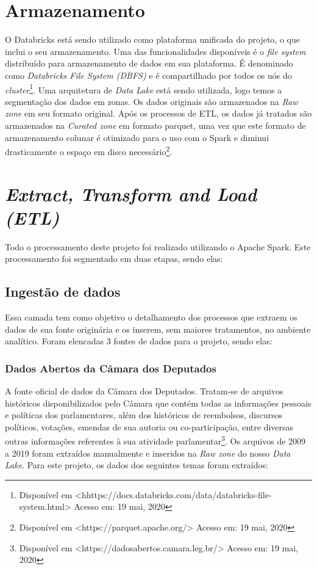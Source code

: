 \section{Armazenamento} O Databricks está sendo utilizado como plataforma unificada do projeto, o que inclui o seu armazenamento. Uma das funcionalidades disponíveis é o \textit{file system} distribuído para armazenamento de dados em sua plataforma. É denominado como \textit{Databricks File System (DBFS)} e é compartilhado por todos os nós do \textit{cluster}\footnote{Disponível em <hhttps://docs.databricks.com/data/databricks-file-system.html> Acesso em: 19 mai, 2020}. Uma arquitetura de \textit{Data Lake} está sendo utilizada, logo temos a segmentação dos dados em zonas. Os dados originais são armazenados na \textit{Raw zone} em seu formato original. Após os processos de ETL, os dados já tratados são armazenados na \textit{Curated zone} em formato parquet, uma vez que este formato de armazenamento colunar é otimizado para o uso com o Spark e diminui drasticamente o espaço em disco necessário\footnote{Disponível em <https://parquet.apache.org/> Acesso em: 19 mai, 2020}.

\section{\textit{Extract, Transform and Load (ETL)}} Todo o processamento deste projeto foi realizado utilizando o Apache Spark. Este processamento foi segmentado em duas etapas, sendo elas:

\subsection{Ingestão de dados} Essa camada tem como objetivo o detalhamento dos processos que extraem os dados de sua fonte originária e os inserem, sem maiores tratamentos, no ambiente analítico. Foram elencadas 3 fontes de dados para o projeto, sendo elas:

\subsubsection{Dados Abertos da Câmara dos Deputados} A fonte oficial de dados da Câmara dos Deputados. Tratam-se de arquivos históricos disponibilizados pelo Câmara que contém todas as informações pessoais e políticas dos parlamentares, além dos históricos de reembolsos, discursos políticos, votações, emendas de sua autoria ou co-participação, entre diversas outras informações referentes à sua atividade parlamentar\footnote{Disponível em <https://dadosabertos.camara.leg.br/> Acesso em: 19 mai, 2020}. Os arquivos de 2009 a 2019 foram extraídos manualmente e inseridos na \textit{Raw zone} do nosso \textit{Data Lake}. Para este projeto, os dados dos seguintes temas foram extraídos:

